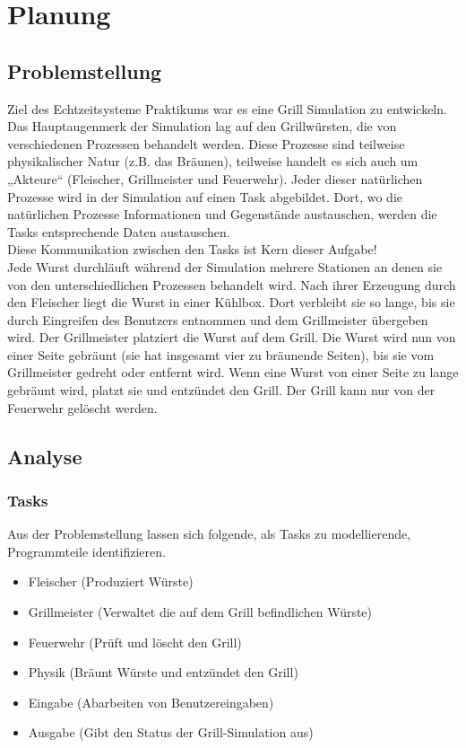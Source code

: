 \chapter{Planung}

\section{Problemstellung}

Ziel des Echtzeitsysteme Praktikums war es eine Grill Simulation
zu entwickeln. Das Hauptaugenmerk der Simulation lag auf den Grillwürsten, die von
verschiedenen Prozessen behandelt werden. Diese Prozesse sind teilweise
physikalischer Natur (z.B. das Bräunen), teilweise handelt es sich auch um „Akteure“
(Fleischer, Grillmeister und Feuerwehr). Jeder dieser natürlichen Prozesse wird in der
Simulation auf einen Task abgebildet. Dort, wo die natürlichen Prozesse Informationen
und Gegenstände austauschen, werden die Tasks entsprechende Daten austauschen. \\
Diese Kommunikation zwischen den Tasks ist Kern dieser Aufgabe! \\
Jede Wurst durchläuft während der Simulation mehrere Stationen an denen sie von
den unterschiedlichen Prozessen behandelt wird. Nach ihrer Erzeugung durch den
Fleischer liegt die Wurst in einer Kühlbox. Dort verbleibt sie so lange, bis sie durch
Eingreifen des Benutzers entnommen und dem Grillmeister übergeben wird. Der
Grillmeister platziert die Wurst auf dem Grill. Die Wurst wird nun von einer Seite
gebräunt (sie hat insgesamt vier zu bräunende Seiten), bis sie vom Grillmeister
gedreht oder entfernt wird. Wenn eine Wurst von einer Seite zu lange gebräunt wird,
platzt sie und entzündet den Grill. Der Grill kann nur von der Feuerwehr gelöscht
werden.

\section{Analyse}

\subsection{Tasks}

Aus der Problemstellung lassen sich folgende, als Tasks zu modellierende, Programmteile identifizieren.

\begin{itemize}
\item Fleischer (Produziert Würste)
\item Grillmeister (Verwaltet die auf dem Grill befindlichen Würste)
\item Feuerwehr (Prüft und löscht den Grill)
\item Physik (Bräunt Würste und entzündet den Grill)
\item Eingabe (Abarbeiten von Benutzereingaben)
\item Ausgabe (Gibt den Status der Grill-Simulation aus)
\end{itemize}

